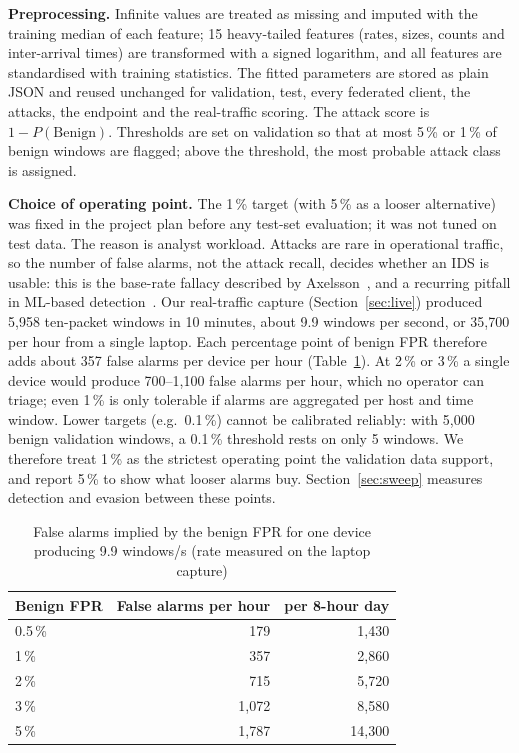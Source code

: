 \documentclass[conference]{IEEEtran}
\begin{document}
\textbf{Preprocessing.} Infinite values are treated as missing and imputed with the training median of each feature; 15 heavy-tailed features (rates, sizes, counts and inter-arrival times) are transformed with a signed logarithm, and all features are standardised with training statistics. The fitted parameters are stored as plain JSON and reused unchanged for validation, test, every federated client, the attacks, the endpoint and the real-traffic scoring.
The attack score is $1-P(\text{Benign})$. Thresholds are set on validation so that at most 5\,\% or 1\,\% of benign windows are flagged; above the threshold, the most probable attack class is assigned.

\textbf{Choice of operating point.} The 1\,\% target (with 5\,\% as a looser alternative) was fixed in the project plan before any test-set evaluation; it was not tuned on test data. The reason is analyst workload. Attacks are rare in operational traffic, so the number of false alarms, not the attack recall, decides whether an IDS is usable: this is the base-rate fallacy described by Axelsson~\cite{axelsson2000baserate}, and a recurring pitfall in ML-based detection~\cite{sommer2010closedworld,arp2022dos}. Our real-traffic capture (Section~\ref{sec:live}) produced 5,958 ten-packet windows in 10 minutes, about 9.9 windows per second, or 35,700 per hour from a single laptop. Each percentage point of benign FPR therefore adds about 357 false alarms per device per hour (Table~\ref{tab:workload}). At 2\,\% or 3\,\% a single device would produce 700--1,100 false alarms per hour, which no operator can triage; even 1\,\% is only tolerable if alarms are aggregated per host and time window. Lower targets (e.g.\ 0.1\,\%) cannot be calibrated reliably: with 5,000 benign validation windows, a 0.1\,\% threshold rests on only 5 windows. We therefore treat 1\,\% as the strictest operating point the validation data support, and report 5\,\% to show what looser alarms buy. Section~\ref{sec:sweep} measures detection and evasion between these points.

\begin{table}[t]
\caption{False alarms implied by the benign FPR for one device producing 9.9 windows/s (rate measured on the laptop capture)}\label{tab:workload}
\centering\footnotesize
\begin{tabular}{@{}lrr@{}}
\toprule
Benign FPR & False alarms per hour & per 8-hour day \\
\midrule
0.5\,\% & 179 & 1,430 \\
1\,\% & 357 & 2,860 \\
2\,\% & 715 & 5,720 \\
3\,\% & 1,072 & 8,580 \\
5\,\% & 1,787 & 14,300 \\
\bottomrule
\end{tabular}
\end{table}
\end{document}
